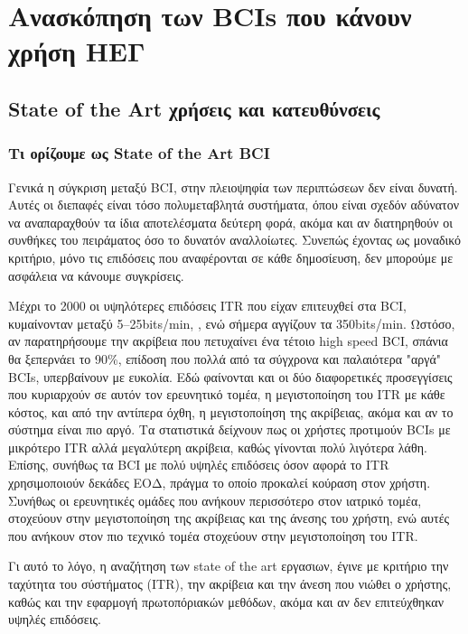 \documentclass[11pt,a4paper,english,greek,twoside]{../Thesis}
\begin{document}
\chapter{Ανασκόπηση των BCIs που κάνουν χρήση ΗΕΓ} \label{chap:survey}

\section{State of the Art χρήσεις και κατευθύνσεις}

\subsection{Τι ορίζουμε ως State of the Art BCI}

\par Γενικά η σύγκριση μεταξύ BCI, στην πλειοψηφία των περιπτώσεων δεν είναι δυνατή. Αυτές οι διεπαφές είναι τόσο πολυμεταβλητά συστήματα, όπου είναι σχεδόν αδύνατον να αναπαραχθούν τα ίδια αποτελέσματα δεύτερη φορά, ακόμα και αν διατηρηθούν οι συνθήκες του πειράματος όσο το δυνατόν αναλλοίωτες. Συνεπώς έχοντας ως μοναδικό κριτήριο, μόνο τις επιδόσεις που αναφέρονται σε κάθε δημοσίευση, δεν μπορούμε με ασφάλεια να κάνουμε συγκρίσεις. 

\par  Μέχρι το 2000 οι υψηλότερες επιδόσεις ITR που είχαν επιτευχθεί στα BCI, κυμαίνονταν μεταξύ 5–25bits/min, \cite{wolpaw2000brain}, ενώ σήμερα αγγίζουν τα 350bits/min. Ωστόσο, αν παρατηρήσουμε την ακρίβεια που πετυχαίνει ένα τέτοιο high speed BCI, σπάνια θα ξεπερνάει το 90\%, επίδοση που πολλά από τα σύγχρονα και παλαιότερα "αργά" BCIs, υπερβαίνουν με ευκολία. Εδώ φαίνονται και οι δύο διαφορετικές προσεγγίσεις που κυριαρχούν σε αυτόν τον ερευνητικό τομέα, η μεγιστοποίηση του ITR με κάθε κόστος, και από την αντίπερα όχθη, η μεγιστοποίηση της ακρίβειας, ακόμα και αν το σύστημα είναι πιο αργό. Τα στατιστικά δείχνουν πως οι χρήστες προτιμούν BCIs με μικρότερο ITR αλλά μεγαλύτερη ακρίβεια, καθώς γίνονται πολύ λιγότερα λάθη. Επίσης, συνήθως τα BCI με πολύ υψηλές επιδόσεις όσον αφορά το ITR χρησιμοποιούν δεκάδες ΕΟΔ, πράγμα το οποίο προκαλεί κούραση στον χρήστη. Συνήθως οι ερευνητικές ομάδες που ανήκουν περισσότερο στον ιατρικό τομέα, στοχεύουν στην μεγιστοποίηση της ακρίβειας και της άνεσης του χρήστη, ενώ αυτές που ανήκουν στον πιο τεχνικό τομέα στοχεύουν στην μεγιστοποίηση του ITR. 

\par Γι αυτό το λόγο, η αναζήτηση των state of the art εργασιων, έγινε με κριτήριο την ταχύτητα του σύστήματος (ITR), την ακρίβεια και την άνεση που νιώθει ο χρήστης, καθώς και την εφαρμογή πρωτοπόριακών μεθόδων, ακόμα και αν δεν επιτεύχθηκαν υψηλές επιδόσεις.
\end{document}
